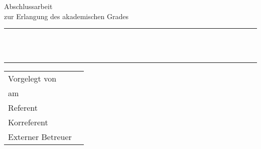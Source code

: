 %
%
%

\begin{titlepage}
	\begin{center}
		\doIfNoText{\theuniversitylogo}{{\LARGE\theuniversity} \\[0.7cm]}
		{\thedepartment}
		
		\vfill

		{\LARGE Abschlussarbeit} \\[0.5cm]
		{\large zur Erlangung des akademischen Grades} \\[0.5cm]
		{\large \theacademicdegree}
		
		\rule{\textwidth}{1pt}\\[0.5cm]
		{\huge \bfseries \thetitle}\\[0.1cm]
		\rule{\textwidth}{1pt}
		
		\vfill
		
		\begin{tabular}{lr}
			Vorgelegt von & \theauthor \\
			am & \thedate \\
			Referent & \thesupervisor \\
			Korreferent & \thecosupervisor
			\doIfText{\theexternalsupervisor}{\\ Externer Betreuer & \theexternalsupervisor}
		\end{tabular}
		
		\vfill
		
	\end{center}
\end{titlepage}
